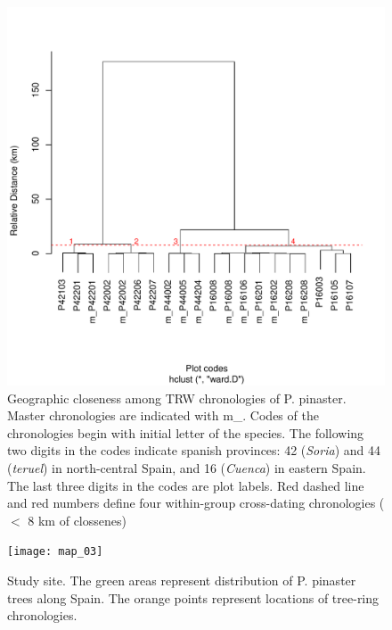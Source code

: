 \documentclass[review,authoryear]{elsarticle}
\begin{document}
\clearpage
\begin{figure}\centering
\includegraphics[scale=0.8,trim=20mm 0mm 20mm 0mm]{clust} 
\caption{Geographic closeness among \acrfull{TRW} chronologies of
  \gls{P. pinaster}. Master chronologies are indicated with m\_. Codes
  of the chronologies begin with initial letter of the species. The
  following two digits in the codes indicate spanish provinces: 42
  (\textit{Soria}) and 44 (\textit{teruel}) in north-central Spain,
  and 16 (\textit{Cuenca}) in eastern Spain. The last three digits in
  the codes are plot labels. Red dashed line and red numbers define
  four within-group cross-dating chronologies ($<$ 8 km of clossenes)}
\label{fig:clust} 
\end{figure}

\clearpage
\begin{figure}\centering
\texttt{[image: map\_03]} 
\caption{Study site. The green areas represent distribution of
  \gls{P. pinaster} trees along Spain. The orange points represent
  locations of tree-ring chronologies.}
\label{fig:map_03} 
\end{figure}
\end{document}
